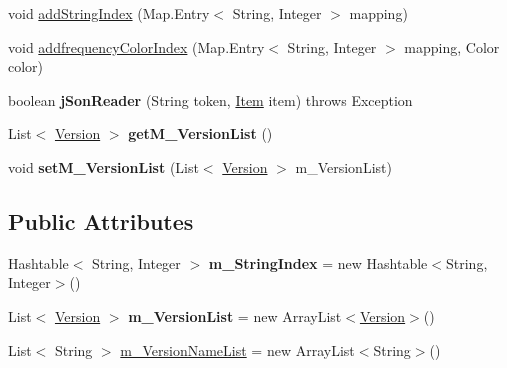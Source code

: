 \begin{DoxyCompactItemize}
\item 
void \hyperlink{classtranslation_visualization_1_1_data_reader_a9ba21aa239b09589289b5f89215a96de}{add\+String\+Index} (Map.\+Entry$<$ String, Integer $>$ mapping)
\item 
void \hyperlink{classtranslation_visualization_1_1_data_reader_aa9da818caa573b52c9a35e01b2f5ed13}{addfrequency\+Color\+Index} (Map.\+Entry$<$ String, Integer $>$ mapping, Color color)
\item 
\mbox{\label{classtranslation_visualization_1_1_data_reader_ab1443b5594b84b6a7efb5c5b0e3d8f5d}} 
boolean {\bfseries j\+Son\+Reader} (String token, \hyperlink{classtranslation_visualization_1_1_item}{Item} item)  throws Exception
\item 
\mbox{\label{classtranslation_visualization_1_1_data_reader_a56175a8c90602f43f50774e9ba9f0962}} 
List$<$ \hyperlink{classtranslation_visualization_1_1_version}{Version} $>$ {\bfseries get\+M\+\_\+\+Version\+List} ()
\item 
\mbox{\label{classtranslation_visualization_1_1_data_reader_aa54ba80cb9f990505887ce137bbc4b63}} 
void {\bfseries set\+M\+\_\+\+Version\+List} (List$<$ \hyperlink{classtranslation_visualization_1_1_version}{Version} $>$ m\+\_\+\+Version\+List)
\end{DoxyCompactItemize}
\subsection*{Public Attributes}
\begin{DoxyCompactItemize}
\item 
\mbox{\label{classtranslation_visualization_1_1_data_reader_a14be5db06decff77ee886a7c9e2e3f36}} 
Hashtable$<$ String, Integer $>$ {\bfseries m\+\_\+\+String\+Index} = new Hashtable$<$String, Integer$>$()
\item 
\mbox{\label{classtranslation_visualization_1_1_data_reader_a80ba7c2a13f9eacbb00b50fae9523210}} 
List$<$ \hyperlink{classtranslation_visualization_1_1_version}{Version} $>$ {\bfseries m\+\_\+\+Version\+List} = new Array\+List$<$\hyperlink{classtranslation_visualization_1_1_version}{Version}$>$()
\item 
List$<$ String $>$ \hyperlink{classtranslation_visualization_1_1_data_reader_a6d82a8e75d6620a2ea93bb3367eccdf2}{m\+\_\+\+Version\+Name\+List} = new Array\+List$<$String$>$()
\end{DoxyCompactItemize}


